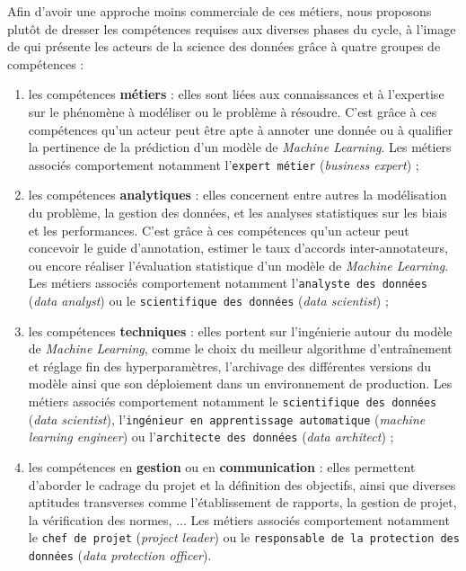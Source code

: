 		Afin d'avoir une approche moins commerciale de ces métiers, nous proposons plutôt de dresser les compétences requises aux diverses phases du cycle, à l'image de \cite{radovilsky-etal:2018:skills-requirements-business} qui présente les acteurs de la science des données grâce à quatre groupes de compétences :
		\begin{enumerate}
			\item les compétences \textbf{métiers} : elles sont liées aux connaissances et à l'expertise sur le phénomène à modéliser ou le problème à résoudre.
			C'est grâce à ces compétences qu'un acteur peut être apte à annoter une donnée ou à qualifier la pertinence de la prédiction d'un modèle de \textit{Machine Learning}.
			Les métiers associés comportement notamment l'\texttt{expert métier} (\textit{business expert}) ;
			\item les compétences \textbf{analytiques} : elles concernent entre autres la modélisation du problème, la gestion des données, et les analyses statistiques sur les biais et les performances.
			C'est grâce à ces compétences qu'un acteur peut concevoir le guide d'annotation, estimer le taux d'accords inter-annotateurs, ou encore réaliser l'évaluation statistique d'un modèle de \textit{Machine Learning}.
			Les métiers associés comportement notamment l'\texttt{analyste des données} (\textit{data analyst}) ou le \texttt{scientifique des données} (\textit{data scientist}) ;
			\item les compétences \textbf{techniques} : elles portent sur l'ingénierie autour du modèle de \textit{Machine Learning}, comme le choix du meilleur algorithme d'entraînement et réglage fin des hyperparamètres, l'archivage des différentes versions du modèle ainsi que son déploiement dans un environnement de production.
			Les métiers associés comportement notamment le \texttt{scientifique des données} (\textit{data scientist}), l'\texttt{ingénieur en apprentissage automatique} (\textit{machine learning engineer}) ou l'\texttt{architecte des données} (\textit{data architect}) ;
			\item les compétences en \textbf{gestion} ou en \textbf{communication} : elles permettent d'aborder le cadrage du projet et la définition des objectifs, ainsi que diverses aptitudes transverses comme l'établissement de rapports, la gestion de projet, la vérification des normes, ...
			Les métiers associés comportement notamment le \texttt{chef de projet} (\textit{project leader}) ou le \texttt{responsable de la protection des données} (\textit{data protection officer}).
		\end{enumerate}
